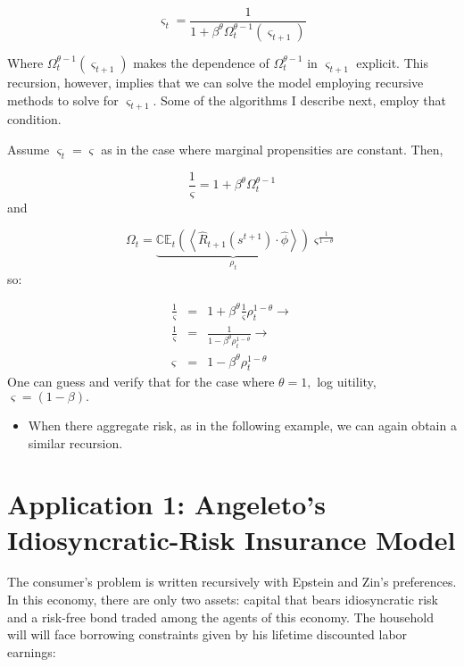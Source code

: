 \documentclass{article}
\begin{document}
\begin{equation*}
\varsigma _{t}=\frac{1}{1+\beta ^{\theta }\Omega _{t}^{\theta -1}\left(
\varsigma _{t+1}\right) }
\end{equation*}

Where $\Omega _{t}^{\theta -1}\left( \varsigma _{t+1}\right) $ makes the
dependence of $\Omega _{t}^{\theta -1}$ in $\varsigma _{t+1}$ explicit. This
recursion, however, implies that we can solve the model employing recursive
methods to solve for $\varsigma _{t+1}$. Some of the algorithms I describe
next, employ that condition.

Assume $\varsigma _{t}=\varsigma $ as in the case where marginal
propensities are constant. Then,

\begin{equation*}
\frac{1}{\varsigma }=1+\beta ^{\theta }\Omega _{t}^{\theta -1}
\end{equation*}%
and

\begin{equation*}
\Omega _{t}=\underbrace{\mathbb{CE}_{t}\left( \left\langle \hat{R}%
_{t+1}\left( s^{t+1}\right) \cdot \hat{\phi}\right\rangle \right) }_{\rho
_{t}}\varsigma ^{\frac{1}{1-\theta }}
\end{equation*}%
so:

\begin{eqnarray*}
\frac{1}{\varsigma } &=&1+\beta ^{\theta }\frac{1}{\varsigma }\rho
_{t}^{1-\theta }\rightarrow \\
\frac{1}{\varsigma } &=&\frac{1}{1-\beta ^{\theta }\rho _{t}^{1-\theta }}%
\rightarrow \\
\varsigma &=&1-\beta ^{\theta }\rho _{t}^{1-\theta }
\end{eqnarray*}%
One can guess and verify that for the case where $\theta =1,$ log uitility, $%
\varsigma =\left( 1-\beta \right) .$

\begin{itemize}
\item When there aggregate risk, as in the following example, we can again
obtain a similar recursion.
\end{itemize}

\section{Application 1: Angeleto's Idiosyncratic-Risk Insurance Model}

The consumer's problem is written recursively with Epstein and Zin's
preferences. In this economy, there are only two assets: capital that bears
idiosyncratic risk and a risk-free bond traded among the agents of this
economy. The household will will face borrowing constraints given by his
lifetime discounted labor earnings:
\end{document}

